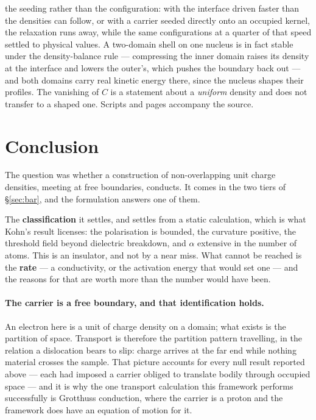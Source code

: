 \documentclass[11pt]{article}
\begin{document}
the seeding rather than the configuration: with the interface driven faster than the densities can
follow, or with a carrier seeded directly onto an occupied kernel, the relaxation runs away, while the
same configurations at a quarter of that speed settled to physical values. A two-domain shell on one
nucleus is in fact stable under the density-balance rule --- compressing the inner domain raises its
density at the interface and lowers the outer's, which pushes the boundary back out --- and both
domains carry real kinetic energy there, since the nucleus shapes their profiles. The vanishing of
$C$ is a statement about a \emph{uniform} density and does not transfer to a shaped one. Scripts and pages accompany the source.



\section{Conclusion}\label{sec:conclusion}

The question was whether a construction of non-overlapping unit charge densities, meeting at free
boundaries, conducts. It comes in the two tiers of \S\ref{sec:bar}, and the formulation answers one
of them.

The \textbf{classification} it settles, and settles from a static calculation, which is what Kohn's
result licenses: the polarisation is bounded, the curvature positive, the threshold field beyond
dielectric breakdown, and $\alpha$ extensive in the number of atoms. This is an insulator, and not
by a near miss. What cannot be reached is the \textbf{rate} --- a conductivity, or the activation
energy that would set one --- and the reasons for that are worth more than the number would have
been.

\paragraph{The carrier is a free boundary, and that identification holds.} An electron here is a
unit of charge density on a domain; what exists is the partition of space. Transport is therefore
the partition pattern travelling, in the relation a dislocation bears to slip: charge arrives at the
far end while nothing material crosses the sample. That picture accounts for every null result
reported above --- each had imposed a carrier obliged to translate bodily through occupied space ---
and it is why the one transport calculation this framework performs successfully is Grotthuss
conduction, where the carrier is a proton and the framework does have an equation of motion for it.
\end{document}
